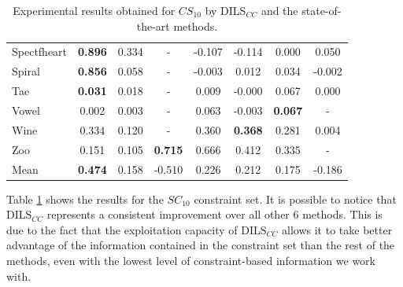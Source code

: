 \documentclass[review]{elsarticle}
\begin{document}
\begin{table}[!h]
{\begin{tabular}{lccccccc}
			Spectfheart & \textbf{0.896} & 0.334 & - & -0.107 & -0.114 & 0.000 & 0.050 \\
			Spiral & \textbf{0.856} & 0.058 & - & -0.003 & 0.012 & 0.034 & -0.002 \\
			Tae & \textbf{0.031} & 0.018 & - & 0.009 & -0.000 & 0.067 & 0.000 \\
			Vowel & 0.002 & 0.003 & - & 0.063 & -0.003 & \textbf{0.067} & - \\
			Wine & 0.334 & 0.120 & - & 0.360 & \textbf{0.368} & 0.281 & 0.004 \\
			Zoo & 0.151 & 0.105 & \textbf{0.715} & 0.666 & 0.412 & 0.335 & - \\
			\hline
			Mean & \textbf{0.474} & 0.158 & -0.510 & 0.226 & 0.212 & 0.175 & -0.186 \\
			\hline
			
		\end{tabular}}
		
	\caption{Experimental results obtained for $CS_{10}$ by DILS$_{CC}$ and the state-of-the-art methods.}
	\label{tab:results10}
\end{table}

Table \ref{tab:results10} shows the results for the $SC_{10}$ constraint set. It is possible to notice that DILS$_{CC}$ represents a consistent improvement over all other 6 methods. This is due to the fact that the exploitation capacity of DILS$_{CC}$ allows it to take better advantage of the information contained in the constraint set than the rest of the methods, even with the lowest level of constraint-based information we work with.
\end{document}
